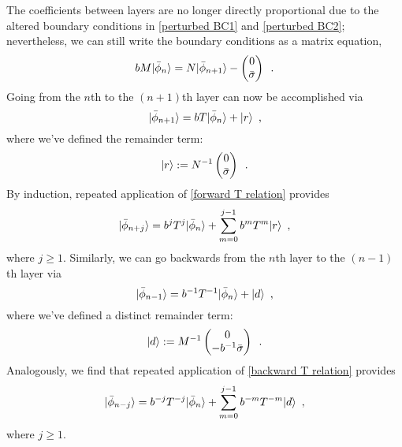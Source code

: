 The coefficients between layers are no longer directly proportional due to the altered boundary conditions in \eqref{perturbed BC1} and \eqref{perturbed BC2}; nevertheless, we can still write the boundary conditions as a matrix equation,
\begin{equation}
    \label{perturbed matrix BC}
    bM\lvert\bar\phi_n\rangle = N\lvert\bar \phi_{n+1}\rangle
    -
    \begin{pmatrix}
    0
    \\
    \bar\sigma
    \end{pmatrix}
    \,\,\,.
\end{equation}
Going from the $n$th to the $(n+1)$th layer can now be accomplished via
\begin{equation}
    \label{forward T relation}
    \lvert\bar\phi_{n+1}\rangle
    =
    bT\lvert\bar\phi_n\rangle+\lvert r\rangle
    \,\,\,,
\end{equation}
where we've defined the remainder term:
\begin{equation}
    \label{r def}
    \lvert r\rangle := N^{-1}\begin{pmatrix}
    0
    \\
    \bar\sigma
    \end{pmatrix}
    \,\,\,.
\end{equation}
By induction, repeated application of \eqref{forward T relation} provides
\begin{equation}
    \label{forward j T relation}
    \lvert\bar\phi_{n+j}\rangle = b^j T^j\lvert\bar\phi_{n}\rangle + \sum_{m=0}^{j-1} b^m T^m\lvert r\rangle
    \,\,\,,
\end{equation}
where $j\ge1$.  Similarly, we can go backwards from the $n$th layer to the $(n-1)$th layer via
\begin{equation}
    \label{backward T relation}
    \lvert\bar\phi_{n-1}\rangle = b^{-1}T^{-1}\lvert\bar\phi_{n}\rangle + \lvert d\rangle
    \,\,\,,
\end{equation}
where we've defined a distinct remainder term:
\begin{equation}
    \label{d def}
    \lvert d\rangle:=M^{-1}
    \begin{pmatrix}
    0
    \\
    -b^{-1}\bar\sigma
    \end{pmatrix}
    \,\,\,.
\end{equation}
Analogously, we find that repeated application of \eqref{backward T relation} provides
\begin{equation}
    \label{backward j T relation}
    \lvert\bar\phi_{n-j}\rangle
    =
    b^{-j} T^{-j}\lvert\bar\phi_n\rangle +\sum_{m=0}^{j-1}b^{-m}T^{-m}\lvert d\rangle
    \,\,\,,
\end{equation}
where $j\ge1$.

